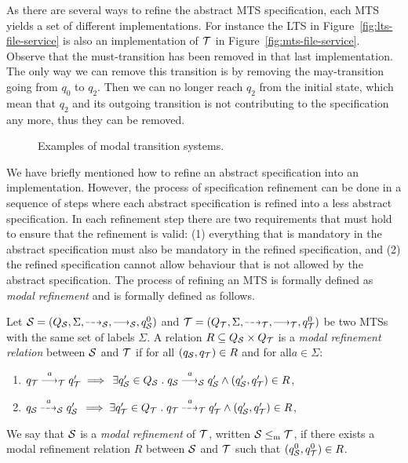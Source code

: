 As there are several ways to refine the abstract MTS specification, each MTS yields a set of different implementations. For instance the LTS in Figure~\ref{fig:lts-file-service} is also an implementation of $\T$ in Figure~\ref{fig:mts-file-service}. Observe that the must-transition  has been removed in that last implementation. The only way we can remove this transition is by removing the may-transition  going from $q_0$ to $q_2$. Then we can no longer reach $q_2$ from the initial state, which mean that $q_2$ and its outgoing transition is not contributing to the specification any more, thus they can be removed.

\begin{figure}[ht]    
\centering
    \caption{Examples of modal transition systems.}
\end{figure}    

We have briefly mentioned how to refine an abstract specification into an implementation. However, the process of specification refinement can be done in a sequence of steps where each abstract specification is refined into a less abstract specification. In each refinement step there are two requirements that must hold to ensure that the refinement is valid: (1) everything that is mandatory in the abstract specification must also be mandatory in the refined specification, and (2) the refined specification cannot allow behaviour that is not allowed by the abstract specification. The process of refining an MTS is formally defined as \emph{modal refinement} and is formally defined as follows.
\begin{definition}\label{def:intro-mr}
   Let $\S = \MTStupmr{\S}$ and $\T = \MTStupmr{\T}$ be two MTSs with the same set of labels $\Sigma$. 
    A relation $R \subseteq Q_\S \times Q_\T$ is a \emph{modal refinement relation} between $\S$ and $\T$ if for all $(q_\S,q_\T) \in R$ and for all$ a \in \Sigma$:%
    \begin{enumerate}
        \item\label{def:wmr:must:a} $ q_\T \must{a}_\T q_\T' \implies \,\exists q_\S' \in Q_\S \;.\; q_\S \must{a}_\S q_\S' \wedge (q_\S',q_\T') \in R$,
        \item\label{def:wmr:may:a} $ q_\S \may{a}_\S q_\S'\, \implies \exists q_\T' \in Q_\T \;.\; q_\T \may{a}_\T q_\T' \wedge (q_\S',q_\T') \in R$,
    \end{enumerate}
 We say that $\S$ is a \emph{modal refinement} of $\T$, written $\S \mr \T$, if there exists a modal refinement relation $R$ between $\S$ and $\T$ such that $(q^0_{\S},q^0_{\T}) \in R$. 
\end{definition} 

